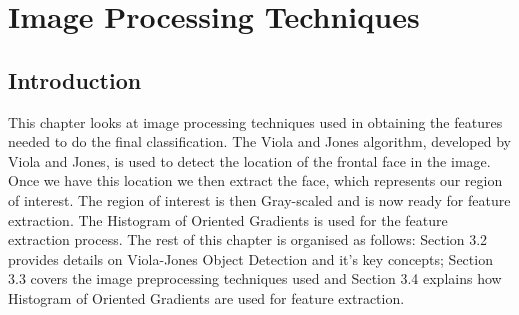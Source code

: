 \chapter{Image Processing Techniques} %
%


\section{Introduction} %
This chapter looks at image processing techniques used in obtaining the features needed to do the final classification. The Viola and Jones algorithm, developed by Viola and Jones, is used to detect the location of the frontal face in the image. Once we have this location we then extract the face, which represents our region of interest. The region of interest is then Gray-scaled and is now ready for feature extraction. The Histogram of Oriented Gradients is used for the feature extraction process. 
\newline
The rest of this chapter is organised as follows: Section 3.2 provides details on Viola-Jones Object Detection and it's key concepts; Section 3.3 covers the image preprocessing techniques used and Section 3.4 explains how Histogram of Oriented Gradients are used for feature extraction.

